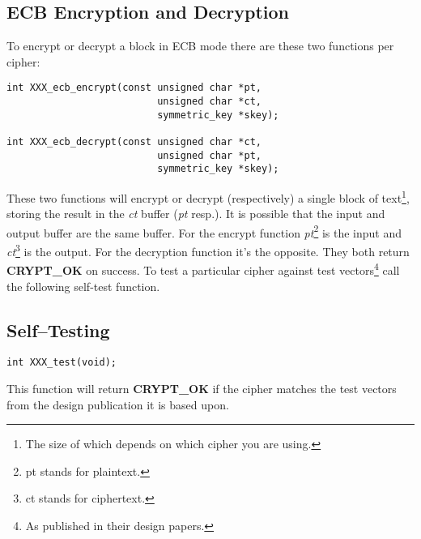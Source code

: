 \documentclass[synpaper]{book}
\begin{document}
\subsection{ECB Encryption and Decryption}
To encrypt or decrypt a block in ECB mode there are these two functions per cipher:
 
\begin{verbatim}
int XXX_ecb_encrypt(const unsigned char *pt, 
                          unsigned char *ct,
                          symmetric_key *skey);

int XXX_ecb_decrypt(const unsigned char *ct, 
                          unsigned char *pt,
                          symmetric_key *skey);
\end{verbatim}
These two functions will encrypt or decrypt (respectively) a single block of text\footnote{The size of which depends on
which cipher you are using.}, storing the result in the \textit{ct} buffer (\textit{pt} resp.).  It is possible that the input and output buffer are 
the same buffer.  For the encrypt function \textit{pt}\footnote{pt stands for plaintext.} is the input and 
\textit{ct}\footnote{ct stands for ciphertext.} is the output.  For the decryption function it's the opposite.  They both
return \textbf{CRYPT\_OK} on success.  To test a particular cipher against test vectors\footnote{As published in their design papers.} 
call the following self-test function.
 
\subsection{Self--Testing}
\begin{verbatim}
int XXX_test(void);
\end{verbatim}
This function will return {\bf CRYPT\_OK} if the cipher matches the test vectors from the design publication it is 
based upon.  
\end{document}
